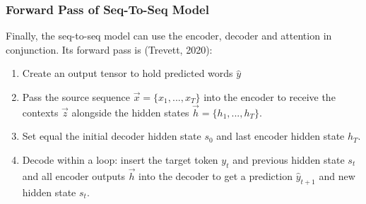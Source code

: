 \begin{center}
\end{center}


\subsubsection{Forward Pass of Seq-To-Seq Model}

Finally, the seq-to-seq model can use the encoder, decoder and attention in conjunction. Its forward pass is (Trevett, 2020): 
\begin{enumerate}
    \item Create an output tensor to hold predicted words $\hat{y}$
    
    \item Pass the source sequence $\overrightarrow{x} = \Big \{ x_1, ..., x_T \Big \}$ into the encoder to receive the contexts $\overrightarrow{z}$ alongside the hidden states $\overrightarrow{h} = \Big \{ h_1, ..., h_T \Big \}$.
    
    \item Set equal the initial decoder hidden state $s_0$ and last encoder hidden state $h_T$.
    
    \item Decode within a loop: insert the target token $y_t$ and previous hidden state $s_t$ and all encoder outputs $\overrightarrow{h}$ into the decoder to get a prediction $\hat{y}_{t+1}$ and new hidden state $s_t$.
    
    
\end{enumerate}


\begin{center}
\end{center}